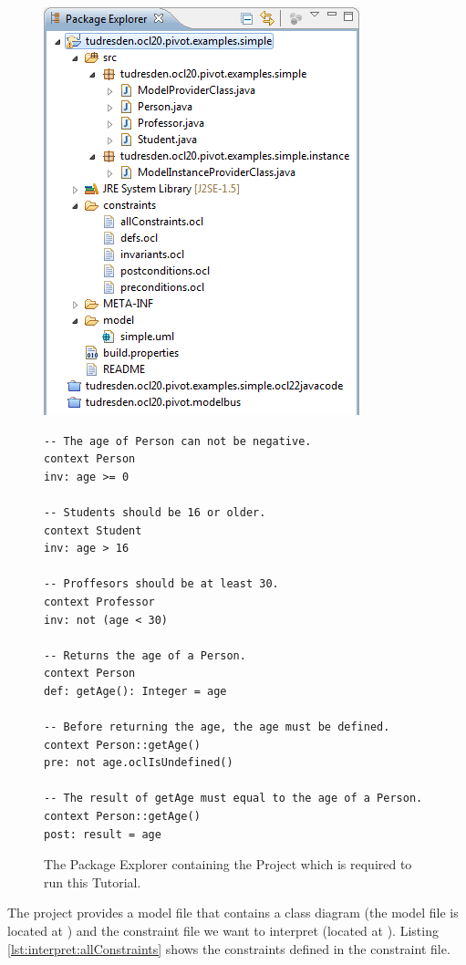 \begin{figure}[!p]
	\centering
	\includegraphics[width=0.5\linewidth]{figures/examples/simple02}
	\caption{The Package Explorer containing the Project which is required to run this Tutorial.}
	\label{pic:example:simple02}
	
	\vspace{4.0em}

  \lstset{
    language=OCL
  }
  \begin{lstlisting}[caption={The Constraints contained in the Constraint File.}, captionpos=b, label=lst:interpret:allConstraints]
-- The age of Person can not be negative.
context Person
inv: age >= 0

-- Students should be 16 or older.
context Student
inv: age > 16

-- Proffesors should be at least 30.
context Professor
inv: not (age < 30)

-- Returns the age of a Person.
context Person
def: getAge(): Integer = age

-- Before returning the age, the age must be defined.
context Person::getAge()
pre: not age.oclIsUndefined()

-- The result of getAge must equal to the age of a Person.
context Person::getAge()
post: result = age
  \end{lstlisting}
\end{figure}

The project provides a model file that contains a class diagram (the model file is located at ) and the constraint file we want to interpret (located at ). Listing \ref{lst:interpret:allConstraints} shows the constraints defined in the constraint file.

